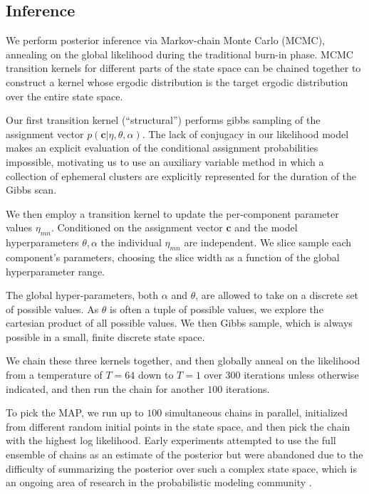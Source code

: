 \documentclass{article}
\renewcommand{\vec}[1]{\mathbf{#1}}
\begin{document}
\subsection{Inference} 
We perform posterior inference via Markov-chain Monte Carlo (MCMC),
annealing on the global likelihood during the traditional burn-in
phase. MCMC transition kernels for different parts of the state space
can be chained together to construct a kernel whose ergodic
distribution is the target ergodic distribution over the entire state space. 

Our first transition kernel (``structural'') performs gibbs sampling 
of the assignment vector $p(\vec{c} | \eta, \theta, \alpha)$. 
The lack of conjugacy in our likelihood model makes an explicit 
evaluation of the conditional assignment probabilities impossible, 
motivating us to use an auxiliary variable method \autocite{Neal2000}
in which a collection of ephemeral clusters are explicitly represented
for the duration of the Gibbs scan. 

We then employ a transition kernel to update the per-component
parameter values $\eta_{mn}$. Conditioned on the assignment vector
$\vec{c}$ and the model hyperparameters $\theta, \alpha$ the 
individual $\eta_{mn}$ are independent. We slice sample \autocite{Neal2003}
each component's parameters, choosing the slice width as a function
of the global hyperparameter range. 

The global hyper-parameters, both $\alpha$ and $\theta$, are allowed
to take on a discrete set of possible values. As $\theta$ is often a
tuple of possible values, we explore the cartesian product of all
possible values. We then Gibbs sample, which is always possible in a 
small, finite discrete state space. 

We chain these three kernels together, and then globally
anneal on the likelihood from a temperature of $T=64$ down to 
$T=1$ over 300 iterations unless otherwise indicated, and
then run the chain for another $100$ iterations. 

To pick the MAP, we run up to $100$ simultaneous chains in parallel,
initialized from different random initial points in the state space,
and then pick the chain with the highest log likelihood. Early
experiments attempted to use the full ensemble of chains as an
estimate of the posterior but were abandoned due to the difficulty of
summarizing the posterior over such a complex state space, which is an
ongoing area of research in the probabilistic modeling community
\autocite{}.
\end{document}
